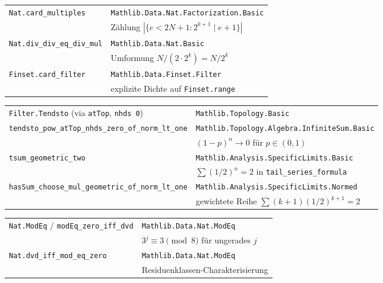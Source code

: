 \documentclass[12pt,a4paper]{article}
\newcommand{\Mathlib}[1]{\texttt{Mathlib.\allowbreak #1}}
\begin{document}
\begin{tcolorbox}[vorhanden,title={Kombinatorik / Dichte}]
\begin{tabular}{@{}p{5.8cm}p{7.8cm}@{}}
\texttt{Nat.card\_multiples} & \Mathlib{Data.Nat.Factorization.Basic} \\
& Zählung $|\{e<2N+1 : 2^{k+1}\mid e+1\}|$ \\
\texttt{Nat.div\_div\_eq\_div\_mul} & \Mathlib{Data.Nat.Basic} \\
& Umformung $N/(2\cdot 2^k)=N/2^k$ \\
\texttt{Finset.card\_filter} & \Mathlib{Data.Finset.Filter} \\
& explizite Dichte auf \texttt{Finset.range} \\
\end{tabular}
\end{tcolorbox}

\begin{tcolorbox}[vorhanden,title={Analysis / Mischschranken}]
\begin{tabular}{@{}p{5.8cm}p{7.8cm}@{}}
\texttt{Filter.Tendsto} (via \texttt{atTop}, \texttt{nhds 0}) & \Mathlib{Topology.Basic} \\
\texttt{tendsto\_pow\_atTop\_nhds\_zero\_of\_norm\_lt\_one} & \Mathlib{Topology.Algebra.InfiniteSum.Basic} \\
& $(1-p)^n\to 0$ für $p\in(0,1)$ \\
\texttt{tsum\_geometric\_two} & \Mathlib{Analysis.SpecificLimits.Basic} \\
& $\sum (1/2)^n=2$ in \texttt{tail\_series\_formula} \\
\texttt{hasSum\_choose\_mul\_geometric\_of\_norm\_lt\_one} & \Mathlib{Analysis.SpecificLimits.Normed} \\
& gewichtete Reihe $\sum (k{+}1)(1/2)^{k+1}=2$ \\
\end{tabular}
\end{tcolorbox}

\begin{tcolorbox}[vorhanden,title={Modulare Arithmetik}]
\begin{tabular}{@{}p{5.8cm}p{7.8cm}@{}}
\texttt{Nat.ModEq} / \texttt{modEq\_zero\_iff\_dvd} & \Mathlib{Data.Nat.ModEq} \\
& $3^j\equiv 3\pmod 8$ für ungerades $j$ \\
\texttt{Nat.dvd\_iff\_mod\_eq\_zero} & \Mathlib{Data.Nat.ModEq} \\
& Residuenklassen-Charakterisierung \\
\end{tabular}
\end{tcolorbox}
\end{document}
